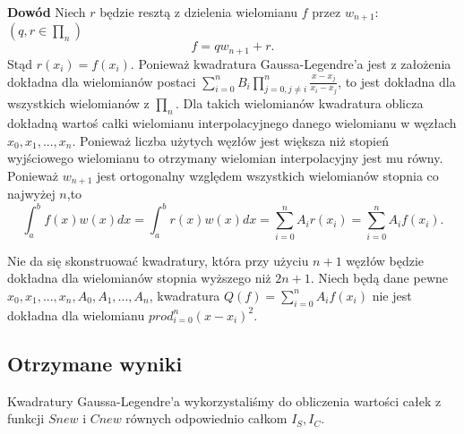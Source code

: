 \documentclass{article}
\begin{document}
\textbf{Dowód} Niech $r$ będzie resztą z dzielenia wielomianu $f$ przez $w_{n+1}$: $(q,r\in \prod_{n})$\[f = qw_{n+1} + r .\] Stąd $r(x_i) = f(x_i)$. Ponieważ kwadratura Gaussa-Legendre'a jest z założenia dokładna dla wielomianów postaci $\sum_{i=0}^n B_i\prod_{j=0,j\neq i}^n \frac{x-x_j}{x_i-x_j}$, to jest dokładna dla wszystkich wielomianów z $\prod_n$. Dla takich wielomianów kwadratura oblicza dokładną wartoś całki wielomianu interpolacyjnego danego wielomianu w węzłach $x_0,x_1,...,x_n$. Ponieważ liczba użytych węzłów jest większa niż stopień wyjściowego wielomianu to otrzymany wielomian interpolacyjny jest mu równy. Ponieważ $w_{n+1}$ jest ortogonalny względem wszystkich wielomianów stopnia co najwyżej $n$,to \[\int_a^b f(x)w(x)dx = \int_a^b r(x)w(x)dx = \sum_{i=0}^n A_ir(x_i) = \sum_{i=0}^n A_if(x_i).\] 

Nie da się skonstruować kwadratury, która przy użyciu $n+1$ węzłów będzie dokładna dla wielomianów stopnia wyższego niż $2n+1$. Niech będą dane pewne $x_0,x_1,...,x_n,A_0,A_1,...,A_n$, kwadratura $Q(f) = \sum_{i=0}^n A_if(x_i)$ nie jest dokładna dla wielomianu $prod_{i=0}^n (x-x_i)^2$.

\subsection{Otrzymane wyniki}
	Kwadratury Gaussa-Legendre'a wykorzystaliśmy do obliczenia wartości całek z funkcji $Snew$ i $Cnew$ równych odpowiednio całkom $I_S,I_C$.
\end{document}
